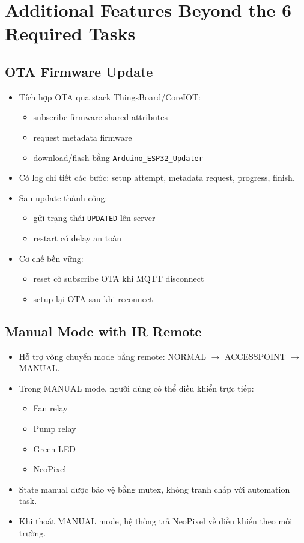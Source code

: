 \section{Additional Features Beyond the 6 Required Tasks}

\subsection{OTA Firmware Update}
\begin{itemize}
    \item Tích hợp OTA qua stack ThingsBoard/CoreIOT:
    \begin{itemize}
        \item subscribe firmware shared-attributes
        \item request metadata firmware
        \item download/flash bằng \texttt{Arduino\_ESP32\_Updater}
    \end{itemize}
    \item Có log chi tiết các bước: setup attempt, metadata request, progress, finish.
    \item Sau update thành công:
    \begin{itemize}
        \item gửi trạng thái \texttt{UPDATED} lên server
        \item restart có delay an toàn
    \end{itemize}
    \item Cơ chế bền vững:
    \begin{itemize}
        \item reset cờ subscribe OTA khi MQTT disconnect
        \item setup lại OTA sau khi reconnect
    \end{itemize}
\end{itemize}

\subsection{Manual Mode with IR Remote}
\begin{itemize}
    \item Hỗ trợ vòng chuyển mode bằng remote: NORMAL $\rightarrow$ ACCESSPOINT $\rightarrow$ MANUAL.
    \item Trong MANUAL mode, người dùng có thể điều khiển trực tiếp:
    \begin{itemize}
        \item Fan relay
        \item Pump relay
        \item Green LED
        \item NeoPixel
    \end{itemize}
    \item State manual được bảo vệ bằng mutex, không tranh chấp với automation task.
    \item Khi thoát MANUAL mode, hệ thống trả NeoPixel về điều khiển theo môi trường.
\end{itemize}

